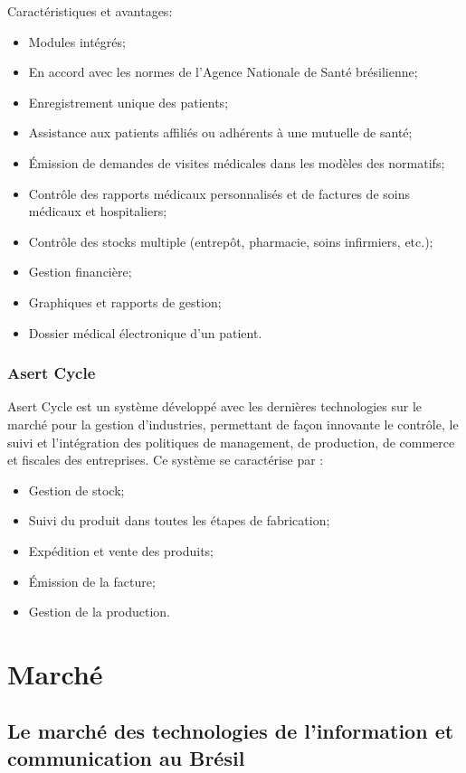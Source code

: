 Caractéristiques et avantages:

\begin{itemize}
\item Modules intégrés;
\item En accord avec les normes de l'Agence Nationale de Santé brésilienne;
\item Enregistrement unique des patients;
\item Assistance aux patients affiliés ou adhérents à une mutuelle de santé;
\item Émission de demandes de visites médicales dans les modèles des normatifs;
\item Contrôle des rapports médicaux personnalisés et de factures de soins médicaux et hospitaliers;
\item Contrôle des stocks multiple (entrepôt, pharmacie, soins infirmiers, etc.);
\item Gestion financière;
\item Graphiques et rapports de gestion;
\item Dossier médical électronique d'un patient.
\end{itemize}

\subsubsection{Asert Cycle}

Asert Cycle est un système développé avec les dernières technologies sur le marché pour la gestion d'industries, permettant de façon innovante le contrôle, le suivi et l'intégration des politiques de management, de production, de commerce et fiscales des entreprises. Ce système se caractérise par :

\begin{itemize}
\item Gestion de stock;
\item Suivi du produit dans toutes les étapes de fabrication;
\item Expédition et vente des produits;
\item Émission de la facture;
\item Gestion de la production.
\end{itemize}

\section{Marché}
\subsection{Le marché des technologies de l'information et communication au Brésil}


